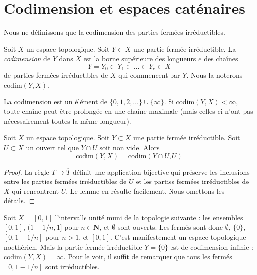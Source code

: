 \section{Codimension et espaces caténaires}
\label{section-catenary-spaces}

\noindent
Nous ne définissons que la codimension des parties fermées irréductibles.

\begin{definition}
\label{definition-codimension}
Soit $X$ un espace topologique.
Soit $Y \subset X$ une partie fermée irréductible.
La {\it codimension} de $Y$ dans $X$ est la borne supérieure des longueurs
$e$ des chaînes
$$
Y = Y_0 \subset Y_1 \subset \ldots \subset Y_e \subset X
$$
de parties fermées irréductibles de $X$ qui commencent par $Y$.
Nous la noterons $\text{codim}(Y, X)$.
\end{definition}

\noindent
La codimension est un élément de $\{0, 1, 2, \ldots\} \cup \{\infty\}$.
Si $\text{codim}(Y, X) < \infty$, toute chaîne peut être prolongée en une
chaîne maximale (mais celles-ci n'ont pas nécessairement toutes la même
longueur).

\begin{lemma}
\label{lemma-codimension-at-generic-point}
Soit $X$ un espace topologique.
Soit $Y \subset X$ une partie fermée irréductible.
Soit $U \subset X$ un ouvert tel que $Y \cap U$ soit non vide. Alors
$$
\text{codim}(Y, X) = \text{codim}(Y \cap U, U)
$$
\end{lemma}

\begin{proof}
La règle $T \mapsto \overline{T}$ définit une application bijective qui
préserve les inclusions entre les parties fermées irréductibles de $U$ et les
parties fermées irréductibles de $X$ qui rencontrent $U$.
Le lemme en résulte facilement. Nous omettons les détails.
\end{proof}

\begin{example}
\label{example-Noetherian-infinite-codimension}
Soit $X = [0, 1]$ l'intervalle unité muni de la topologie suivante : les
ensembles $[0, 1]$, $(1 - 1/n, 1]$ pour $n \in \mathbf{N}$, et $\emptyset$
sont ouverts. Les fermés sont donc $\emptyset$, $\{0\}$,
$[0, 1 - 1/n]$ pour $n > 1$, et $[0, 1]$.
C'est manifestement un espace topologique noethérien. Mais la partie fermée
irréductible $Y = \{0\}$ est de codimension infinie :
$\text{codim}(Y, X) = \infty$.
Pour le voir, il suffit de remarquer que tous les fermés $[0, 1 - 1/n]$ sont
irréductibles.
\end{example}

